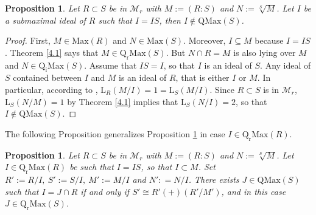 \documentclass[12pt,leqno]{amsart}
\newtheorem{proposition}[theorem]{Proposition}
\theoremstyle{definition}
\begin{document}
\begin{proposition}\label{4.18} Let $R\subset S$ be in $\mathcal M_r$ with $M:=(R:S)$ and $N:=\sqrt[S]M$. Let $I$ be a submaximal ideal of $R$ 
such that $I=IS$, then $I\not\in\mathrm{QMax}(S)$. 
\end{proposition}

\begin{proof} First, $M\in\mathrm{Max}(R)$ and $N\in\mathrm{Max}(S)$. Moreover, $I\subseteq M$ because $I=IS$. Theorem \ref{4.1} says that $M \in\mathrm{Q_rMax}(S)$. But $N\cap R=M$ is also lying over $M$ and $N\in\mathrm{Q_iMax}(S)$. Assume that $IS=I$, so that $I$ is an ideal of $S$. Any ideal of $S$ contained between $I$ and $M$ is an ideal of $R$, that is either $I$ or $M$. In particular, according to \cite[Theorem 12, p.166]{N}, $\mathrm{L}_R(M/I)=1=\mathrm{L}_S(M/I)$. Since $R\subset S$ is in $\mathcal M_r$, $\mathrm{L}_S(N/M)=1$ by Theorem \ref{4.1} implies that $\mathrm{L}_S (N/I)=2$, so that $I\not\in\mathrm{QMax}(S)$.
\end{proof}

The following Proposition generalizes Proposition \ref{4.18} in case $I\in\mathrm{Q_rMax}(R)$.

\begin{proposition}\label{4.13} Let $R\subset S$ be in $\mathcal M_r$ with $M:=(R:S)$ and $N:=\sqrt[S]M$. Let $I\in\mathrm{Q_rMax}(R)$ be such that $I=IS$, so that $I\subset M$. Set $R':=R/I,\ S':=S/I,\ M':=M/I$ and $N': =N/I $. There exists $ J\in\mathrm{QMax}(S)$ such that $I=J\cap R$ if and only if $S'\cong R'(+)(R'/M')$, and in this case $J\in\mathrm{Q_rMax}(S)$. 
\end{proposition}
\end{document}
